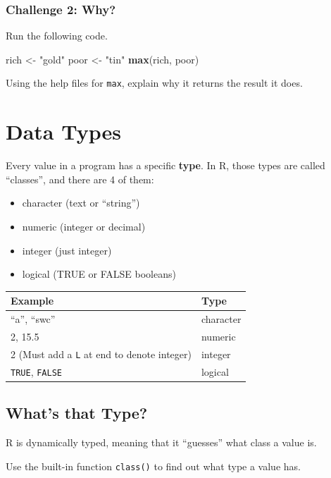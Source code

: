 \documentclass[]{book}
\newenvironment{Shaded}{\begin{snugshade}}{\end{snugshade}}
\newcommand{\KeywordTok}[1]{\textcolor[rgb]{0.13,0.29,0.53}{\textbf{#1}}}
\newcommand{\StringTok}[1]{\textcolor[rgb]{0.31,0.60,0.02}{#1}}
\newcommand{\NormalTok}[1]{#1}
\providecommand{\tightlist}{%
  \setlength{\itemsep}{0pt}\setlength{\parskip}{0pt}}
\begin{document}
\subsubsection*{Challenge 2: Why?}\label{challenge-2-why}

Run the following code.

\begin{Shaded}
\begin{Highlighting}[]
\NormalTok{rich <-}\StringTok{ "gold"}
\NormalTok{poor <-}\StringTok{ "tin"}
\KeywordTok{max}\NormalTok{(rich, poor)}
\end{Highlighting}
\end{Shaded}

Using the help files for \texttt{max}, explain why it returns the result
it does.

\section{Data Types}\label{data-types}

Every value in a program has a specific \textbf{type}. In R, those types
are called ``classes'', and there are 4 of them:

\begin{itemize}
\tightlist
\item
  character (text or ``string'')
\item
  numeric (integer or decimal)
\item
  integer (just integer)
\item
  logical (TRUE or FALSE booleans)
\end{itemize}

\begin{longtable}[]{@{}ll@{}}
\toprule
Example & Type\tabularnewline
\midrule
\endhead
``a'', ``swc'' & character\tabularnewline
2, 15.5 & numeric\tabularnewline
2 (Must add a \texttt{L} at end to denote integer) &
integer\tabularnewline
\texttt{TRUE}, \texttt{FALSE} & logical\tabularnewline
\bottomrule
\end{longtable}

\subsection{What's that Type?}\label{whats-that-type}

R is dynamically typed, meaning that it ``guesses'' what class a value
is.

Use the built-in function \texttt{class()} to find out what type a value
has.
\end{document}

